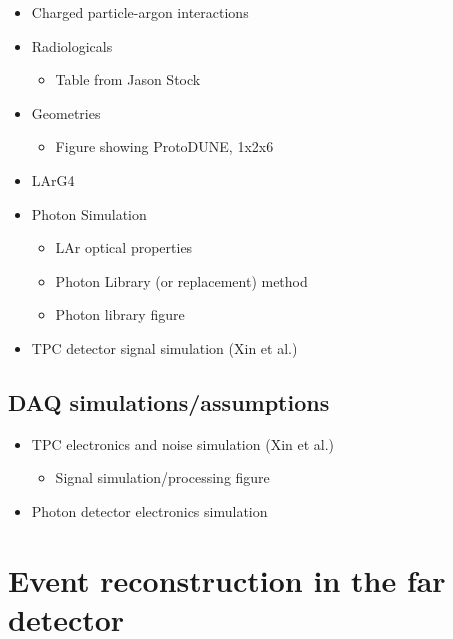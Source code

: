 \begin{itemize}
\item Charged particle-argon interactions
\item Radiologicals
\begin{itemize} \item Table from Jason Stock \end{itemize}
\item Geometries
\begin{itemize} \item Figure showing ProtoDUNE, 1x2x6 \end{itemize}
\item LArG4
\item Photon Simulation
\begin{itemize}
\item LAr optical properties
\item Photon Library (or replacement) method
\item Photon library figure
\end{itemize}
\item TPC detector signal simulation (Xin et al.)
\end{itemize}


\subsection{DAQ simulations/assumptions}
\label{sec:tools-mc-daq}

\begin{itemize}
\item TPC electronics and noise simulation (Xin et al.) 
\begin{itemize} \item Signal simulation/processing figure \end{itemize}
\item Photon detector electronics simulation
\end{itemize}


\section{Event reconstruction in the far detector}
\label{sec:tools-fdreco}


